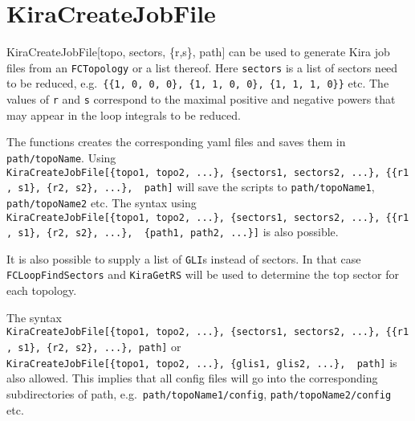 \documentclass[../FeynHelpersManual.tex]{subfiles}
\begin{document}
\begin{Shaded}
\begin{Highlighting}[]
 
\end{Highlighting}
\end{Shaded}

\hypertarget{kiracreatejobfile}{
\section{KiraCreateJobFile}\label{kiracreatejobfile}}

KiraCreateJobFile{[}topo, sectors, \{r,s\}, path{]} can be used to
generate Kira job files from an \texttt{FCTopology} or a list thereof.
Here \texttt{sectors} is a list of sectors need to be reduced,
e.g.~\texttt{\{\allowbreak{}\{\allowbreak{}1,\ \allowbreak{}0,\ \allowbreak{}0,\ \allowbreak{}0\},\ \allowbreak{}\{\allowbreak{}1,\ \allowbreak{}1,\ \allowbreak{}0,\ \allowbreak{}0\},\ \allowbreak{}\{\allowbreak{}1,\ \allowbreak{}1,\ \allowbreak{}1,\ \allowbreak{}0\}\}}
etc. The values of \texttt{r} and \texttt{s} correspond to the maximal
positive and negative powers that may appear in the loop integrals to be
reduced.

The functions creates the corresponding yaml files and saves them in
\texttt{path/topoName}. Using
\texttt{KiraCreateJobFile[\allowbreak{}\{\allowbreak{}topo1,\ \allowbreak{}topo2,\ \allowbreak{}...\},\ \allowbreak{}\{\allowbreak{}sectors1,\ \allowbreak{}sectors2,\ \allowbreak{}...\},\ \allowbreak{}\{\allowbreak{}\{\allowbreak{}r1,\ \allowbreak{}s1\},\ \allowbreak{}\{\allowbreak{}r2,\ \allowbreak{}s2\},\ \allowbreak{}...\},\ \allowbreak{} path]}
will save the scripts to \texttt{path/topoName1},
\texttt{path/topoName2} etc. The syntax using
\texttt{KiraCreateJobFile[\allowbreak{}\{\allowbreak{}topo1,\ \allowbreak{}topo2,\ \allowbreak{}...\},\ \allowbreak{}\{\allowbreak{}sectors1,\ \allowbreak{}sectors2,\ \allowbreak{}...\},\ \allowbreak{}\{\allowbreak{}\{\allowbreak{}r1,\ \allowbreak{}s1\},\ \allowbreak{}\{\allowbreak{}r2,\ \allowbreak{}s2\},\ \allowbreak{}...\},\ \allowbreak{} \{\allowbreak{}path1,\ \allowbreak{}path2,\ \allowbreak{}...\}]}
is also possible.

It is also possible to supply a list of \texttt{GLI}s instead of
sectors. In that case \texttt{FCLoopFindSectors} and \texttt{KiraGetRS}
will be used to determine the top sector for each topology.

The syntax
\texttt{KiraCreateJobFile[\allowbreak{}\{\allowbreak{}topo1,\ \allowbreak{}topo2,\ \allowbreak{}...\},\ \allowbreak{}\{\allowbreak{}sectors1,\ \allowbreak{}sectors2,\ \allowbreak{}...\},\ \allowbreak{}\{\allowbreak{}\{\allowbreak{}r1,\ \allowbreak{}s1\},\ \allowbreak{}\{\allowbreak{}r2,\ \allowbreak{}s2\},\ \allowbreak{}...\},\ \allowbreak{}path]}
or
\texttt{KiraCreateJobFile[\allowbreak{}\{\allowbreak{}topo1,\ \allowbreak{}topo2,\ \allowbreak{}...\},\ \allowbreak{}\{\allowbreak{}glis1,\ \allowbreak{}glis2,\ \allowbreak{}...\},\ \allowbreak{} path]}
is also allowed. This implies that all config files will go into the
corresponding subdirectories of path,
e.g.~\texttt{path/topoName1/config}, \texttt{path/topoName2/config} etc.
\end{document}
